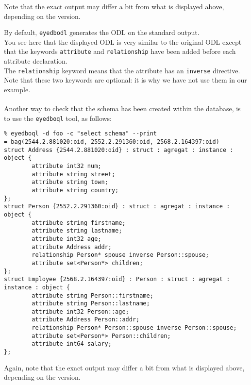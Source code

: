 Note that the exact output may differ a bit from what is displayed above, depending on the \eyedb version.

By default, \texttt{eyedbodl} generates the ODL on the standard output.\\
You see here that the displayed ODL is very similar to the original ODL except
that the keywords \texttt{attribute} and \texttt{relationship} have been added
before each attribute declaration.\\
The \texttt{relationship} keyword means that the attribute has an \texttt{inverse}
directive.
\\
Note that these two keywords are optional: it is why we have not use
them in our example.
\\
\\
Another way to check that the schema has been created within the database,
is to use the \texttt{eyedboql} tool, as follows:
\verbsize \begin{verbatim}
% eyedboql -d foo -c "select schema" --print
= bag(2544.2.881020:oid, 2552.2.291360:oid, 2568.2.164397:oid)
struct Address {2544.2.881020:oid} : struct : agregat : instance : object { 
        attribute int32 num;
        attribute string street;
        attribute string town;
        attribute string country;
};
struct Person {2552.2.291360:oid} : struct : agregat : instance : object { 
        attribute string firstname;
        attribute string lastname;
        attribute int32 age;
        attribute Address addr;
        relationship Person* spouse inverse Person::spouse;
        attribute set<Person*> children;
};
struct Employee {2568.2.164397:oid} : Person : struct : agregat : instance : object { 
        attribute string Person::firstname;
        attribute string Person::lastname;
        attribute int32 Person::age;
        attribute Address Person::addr;
        relationship Person* Person::spouse inverse Person::spouse;
        attribute set<Person*> Person::children;
        attribute int64 salary;
};
\end{verbatim}
\normalsize

Again, note that the exact output may differ a bit from what is displayed above, depending on the \eyedb version.

